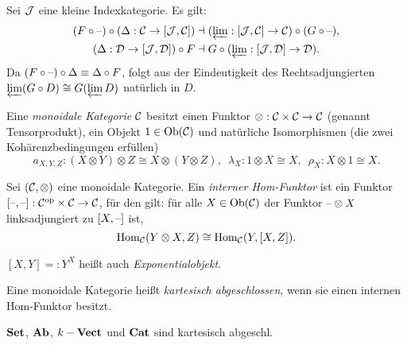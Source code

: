 \documentclass{cheat-sheet}
\begin{document}
\begin{beweis}[RAPL]
  Sei $\mathcal{J}$ eine kleine Indexkategorie.
  Es gilt:
  \begin{align*}
    (F \circ \text{--}) \circ (\Delta : \mathcal{C} \to [\mathcal{J}, \mathcal{C}]) & \dashv (\varprojlim : [\mathcal{J}, \mathcal{C}] \to \mathcal{C}) \circ (G \circ \text{--}), \\
    (\Delta : \mathcal{D} \to [\mathcal{J}, \mathcal{D}]) \circ F & \dashv G \circ (\varprojlim : [\mathcal{J}, \mathcal{D}] \to \mathcal{D}).
  \end{align*}
  Da $(F \circ \text{--}) \circ \Delta \equiv \Delta \circ F$, folgt aus der Eindeutigkeit des Rechtsadjungierten
  $\varprojlim (G \circ D) \cong G(\varprojlim D)$ natürlich in $D$.
\end{beweis}


\begin{defn}
  Eine \emph{monoidale Kategorie} $\mathcal{C}$ besitzt einen Funktor $\otimes : \mathcal{C} \times \mathcal{C} \to \mathcal{C}$ (genannt Tensorprodukt), ein Objekt $1 \in \operatorname{Ob}(\mathcal{C})$ und natürliche Isomorphismen
  (die zwei Kohärenzbedingungen erfüllen)
  \[
    a_{X,Y,Z} : (X \otimes Y) \otimes Z \cong X \otimes (Y \otimes Z), \enspace
    \lambda_X : 1 \otimes X \cong X, \enspace
    \rho_X : X \otimes 1 \cong X.
  \]
\end{defn}

\begin{defn}
  Sei $(\mathcal{C}, \otimes)$ eine monoidale Kategorie. Ein \emph{interner Hom-Funktor} ist ein Funktor $[\text{--},\text{--}] : \mathcal{C}^{\mathrm{op}} \times \mathcal{C} \to \mathcal{C}$, für den gilt: für alle $X \in \operatorname{Ob}(\mathcal{C})$ der Funktor $\text{--} \otimes X$ linksadjungiert zu $[X, \text{--}]$ ist, \dh{}
  \[ \operatorname{Hom}_{\mathcal{C}}(Y \otimes X, Z) \cong \operatorname{Hom}_{\mathcal{C}}(Y, [X, Z]). \]
\end{defn}

\begin{nota}
  $[X, Y] =: Y^X$ heißt auch \emph{Exponentialobjekt}.
\end{nota}

\begin{defn}
  Eine monoidale Kategorie heißt \emph{kartesisch abgeschlossen}, wenn sie einen internen Hom-Funktor besitzt.
\end{defn}

\begin{bspe}
  $\mathbf{Set}$, $\mathbf{Ab}$, $k-\mathbf{Vect}$ und $\mathbf{Cat}$ sind kartesisch abgeschl.
\end{bspe}
\end{document}
